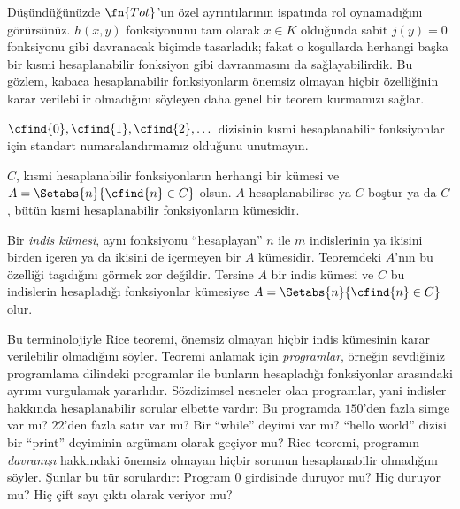 


Düşündüğünüzde $\fn{Tot}$'un özel ayrıntılarının
 ispatında rol oynamadığını görürsünüz. $h(x,y)$
fonksiyonunu tam olarak $x\in K$ olduğunda sabit $j(y)=0$ fonksiyonu gibi
davranacak biçimde tasarladık; fakat o koşullarda herhangi başka bir kısmi
hesaplanabilir fonksiyon gibi davranmasını da sağlayabilirdik. Bu gözlem,
kabaca hesaplanabilir fonksiyonların önemsiz olmayan hiçbir özelliğinin karar
verilebilir olmadığını söyleyen daha genel bir teorem kurmamızı sağlar.

$\cfind{0},\cfind{1},\cfind{2},\dots$ dizisinin kısmi hesaplanabilir
fonksiyonlar için standart numaralandırmamız olduğunu unutmayın.

\begin{thm}
  $C$, kısmi hesaplanabilir fonksiyonların herhangi bir kümesi ve
  $A=\Setabs{n}{\cfind{n}\in C}$ olsun. $A$ hesaplanabilirse ya $C$ boştur
  ya da $C$, bütün kısmi hesaplanabilir fonksiyonların kümesidir.
\end{thm}

Bir \emph{indis kümesi}, aynı fonksiyonu ``hesaplayan'' $n$ ile $m$
indislerinin ya ikisini birden içeren ya da ikisini de içermeyen bir $A$
kümesidir. Teoremdeki $A$'nın bu özelliği taşıdığını görmek zor değildir.
Tersine $A$ bir indis kümesi ve $C$ bu indislerin hesapladığı fonksiyonlar
kümesiyse $A=\Setabs{n}{\cfind{n}\in C}$ olur.

\begin{explain}
Bu terminolojiyle Rice teoremi, önemsiz olmayan hiçbir indis kümesinin karar
verilebilir olmadığını söyler. Teoremi anlamak için \emph{programlar}, örneğin
sevdiğiniz programlama dilindeki programlar ile bunların hesapladığı
fonksiyonlar arasındaki ayrımı vurgulamak yararlıdır. Sözdizimsel nesneler
olan programlar, yani indisler hakkında hesaplanabilir sorular elbette
vardır: Bu programda $150$'den fazla simge var mı? $22$'den fazla satır var
mı? Bir ``while'' deyimi var mı? ``hello world'' dizisi bir ``print''
deyiminin argümanı olarak geçiyor mu? Rice teoremi, programın
\emph{davranışı} hakkındaki önemsiz olmayan hiçbir sorunun hesaplanabilir
olmadığını söyler. Şunlar bu tür sorulardır: Program $0$ girdisinde duruyor
mu? Hiç duruyor mu? Hiç çift sayı çıktı olarak veriyor mu?
\end{explain}

